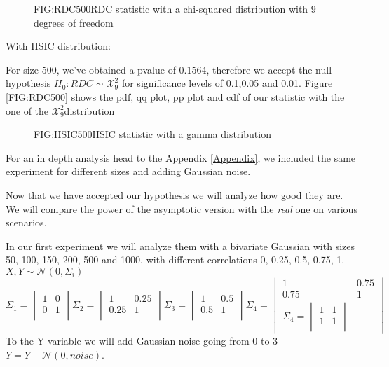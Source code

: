 \begin{figure}[RDC Asymptotic distribution]{FIG:RDC500}{RDC statistic with a chi-squared distribution with 9 degrees of freedom}
\end{figure}

With HSIC distribution:

For size 500, we've obtained a pvalue of 0.1564, therefore we accept the null hypothesis $H_{0}: RDC\sim \mathcal{X}^{2}_{9}$ for significance levels of 0.1,0.05 and 0.01. Figure \ref{FIG:RDC500} shows the pdf, qq plot, pp plot and cdf of our statistic with the one of the $\mathcal{X}^{2}_{9}$distribution
\begin{figure}[HSIC Asymptotic distribution]{FIG:HSIC500}{HSIC statistic with a gamma distribution}
\end{figure}

For an in depth analysis head to the Appendix \ref{Appendix}, we included the same experiment for different sizes and adding Gaussian noise.

Now that we have accepted our hypothesis we will analyze how good they are. We will compare the power of the asymptotic version with the \textit{real} one on various scenarios.

In our first experiment we will analyze them with a bivariate Gaussian with sizes 50, 100, 150, 200, 500 and 1000, with different correlations 0, 0.25, 0.5, 0.75, 1.
$ X,Y \sim \mathcal{N}(0,\Sigma_{i}) $
$$\Sigma_{1} =\begin{vmatrix}1&0\\0&1\\ \end{vmatrix} \Sigma_{2} =\begin{vmatrix}1&0.25\\0.25&1\\ \end{vmatrix} \Sigma_{3} =\begin{vmatrix}1&0.5\\0.5&1\\ \end{vmatrix} \Sigma_{4} =\begin{vmatrix}1&0.75\\0.75&1\\ \Sigma_{4} =\begin{vmatrix}1&1\\1&1\\ \end{vmatrix} \end{vmatrix}$$
To the Y variable we will add  Gaussian noise going from 0 to 3
$ Y = Y + \mathcal{N}(0,noise) $.

